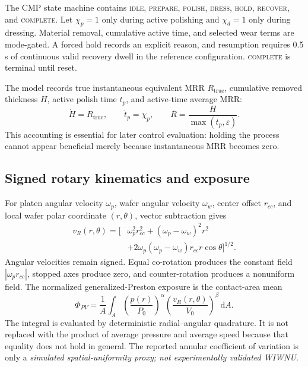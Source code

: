 \documentclass[10pt,twocolumn]{article}
\begin{document}
The CMP state machine contains \textsc{idle}, \textsc{prepare},
\textsc{polish}, \textsc{dress}, \textsc{hold}, \textsc{recover}, and
\textsc{complete}. Let $\chi_p=1$ only during active polishing and
$\chi_d=1$ only during dressing. Material removal, cumulative active time,
and selected wear terms are mode-gated. A forced hold records an explicit
reason, and resumption requires 0.5 s of continuous valid recovery dwell in the
reference configuration. \textsc{complete} is terminal until reset.

The model records true instantaneous equivalent MRR $R_{\mathrm{true}}$,
cumulative removed thickness $H$, active polish time $t_p$, and active-time
average MRR:
\begin{equation}
 \dot H=R_{\mathrm{true}},\qquad
 \dot t_p=\chi_p,\qquad
 \overline R=\frac{H}{\max(t_p,\varepsilon)}.
 \label{eq:cumulative-removal}
\end{equation}
This accounting is essential for later control evaluation: holding the process
cannot appear beneficial merely because instantaneous MRR becomes zero.

\subsection{Signed rotary kinematics and exposure}

For platen angular velocity $\omega_p$, wafer angular velocity $\omega_w$,
center offset $r_{cc}$, and local wafer polar coordinate $(r,\theta)$, vector
subtraction gives
\begin{equation}
\begin{aligned}
 v_R(r,\theta)=\big[&\omega_p^2r_{cc}^2
 +(\omega_p-\omega_w)^2r^2\\
 &+2\omega_p(\omega_p-\omega_w)r_{cc}r\cos\theta
 \big]^{1/2}.
\end{aligned}
 \label{eq:relative-velocity}
\end{equation}
Angular velocities remain signed. Equal co-rotation produces the constant
field $|\omega_pr_{cc}|$, stopped axes produce zero, and counter-rotation
produces a nonuniform field. The normalized generalized-Preston exposure is
the contact-area mean
\begin{equation}
 \Phi_{PV}=\frac{1}{A}\int_A
 \left(\frac{p(r)}{P_0}\right)^{\alpha}
 \left(\frac{v_R(r,\theta)}{V_0}\right)^{\beta}\,\mathrm dA.
 \label{eq:exposure}
\end{equation}
The integral is evaluated by deterministic radial--angular quadrature. It is
not replaced with the product of average pressure and average speed because
that equality does not hold in general. The reported annular coefficient of
variation is only a \emph{simulated spatial-uniformity proxy; not
experimentally validated WIWNU}.
\end{document}
